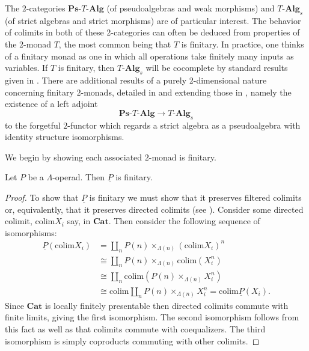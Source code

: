 \documentclass{amsbook} %
\newcommand{\mb}{\mathbf}
\numberwithin{section}{chapter}
\begin{document}
 The $2$-categories $\mb{Ps}\mbox{-}T\mbox{-}\mb{Alg}$ (of pseudoalgebras and weak morphisms) and $T\mbox{-}\mb{Alg}_s$ (of strict algebras and strict morphisms) are of particular interest. The behavior of colimits in both of these 2-categories can often be deduced from properties of the 2-monad $T$, the most common being that $T$ is finitary.  In practice, one thinks of a finitary monad as one in which all operations take finitely many inputs as variables.  If $T$ is finitary, then $T\mbox{-}\mb{Alg}_s$ will be cocomplete by standard results given in \cite{BKP}.  There are additional results of a purely 2-dimensional nature concerning finitary $2$-monads, detailed in \cite{lack-cod} and extending those in \cite{BKP}, namely the existence of a left adjoint
    \[
        \mb{Ps}\mbox{-}T\mbox{-}\mb{Alg} \rightarrow T\mbox{-}\mb{Alg}_s
    \]
to the forgetful $2$-functor which regards a strict algebra as a pseudoalgebra with identity structure isomorphisms.

We begin by showing each associated $2$-monad is finitary.
\begin{prop}
Let $P$ be a $\Lambda$-operad. Then $\underline{P}$ is finitary.
\end{prop}
\begin{proof}
To show that $\underline{P}$ is finitary we must show that it preserves filtered colimits or, equivalently, that it preserves directed colimits (see \cite{ar}). Consider some directed colimit, $\text{colim}X_{i}$ say, in $\mathbf{Cat}$. Then consider the following sequence of isomorphisms:
    \begin{align*}
        \underline{P}(\text{colim}X_{i}) &= \coprod_n P(n) \times_{\Lambda(n)} (\text{colim}X_{i})^n \\
                                                               &\cong \coprod_n P(n) \times_{\Lambda(n)} \text{colim}(X_{i}^n) \\
                                                               &\cong \coprod_n \text{colim}(P(n) \times_{\Lambda(n)} X_{i}^n) \\
                                                               &\cong \text{colim}\coprod_n P(n) \times_{\Lambda(n)} X_{i}^n = \text{colim}\underline{P}(X_{i}).
    \end{align*}
Since $\mathbf{Cat}$ is locally finitely presentable then directed colimits commute with finite limits, giving the first isomorphism. The second isomorphism follows from this fact as well as that colimits commute with coequalizers. The third isomorphism is simply coproducts commuting with other colimits.
\end{proof}
\end{document}
